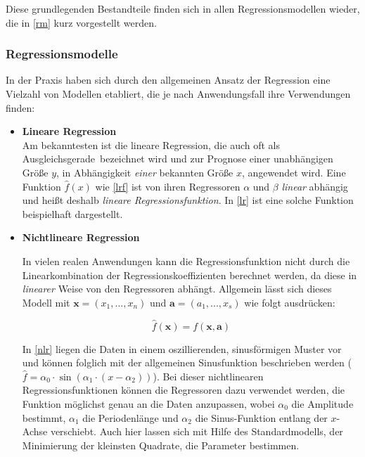 Diese grundlegenden Bestandteile finden sich in allen Regressionsmodellen wieder, die in \vref{rm} kurz vorgestellt werden. 


\subsubsection{Regressionsmodelle}\label{rm}
In der Praxis haben sich durch den allgemeinen Ansatz der Regression eine Vielzahl von Modellen etabliert, die je nach Anwendungsfall ihre Verwendungen finden:


\begin{itemize}


\item \textbf{Lineare Regression}
\\ Am bekanntesten ist die lineare Regression, die auch oft als \glqq Ausgleichsgerade\grqq~bezeichnet wird und zur Prognose einer unabhängigen Größe $y$, in Abhängigkeit \textit{einer} bekannten Größe $x$, angewendet wird. Eine Funktion $\hat{f}(x)$ wie \vref{lrf} ist von ihren Regressoren $\alpha$ und $\beta$ \textit{linear} abhängig und heißt deshalb \textit{lineare Regressionsfunktion}.\enlargethispage{\baselineskip} In \vref{lr} ist eine solche Funktion beispielhaft dargestellt.




\item \textbf{Nichtlineare Regression}

In vielen realen Anwendungen kann die Regressionsfunktion nicht durch die Linearkombination der Regressionskoeffizienten berechnet werden, da diese in \textit{linearer} Weise von den Regressoren abhängt. Allgemein lässt sich dieses Modell mit $\boldsymbol{x} = (x_1,...,x_n)$ und $\boldsymbol{a} = (a_1,...,x_s)$ wie folgt ausdrücken:

\begin{equation}
	\hat{f}(\boldsymbol{x}) = f(\boldsymbol{x},\boldsymbol{a})
\end{equation}

In \vref{nlr} liegen die Daten in einem oszillierenden, sinusförmigen Muster vor und können folglich mit der allgemeinen Sinusfunktion beschrieben werden ($\hat{f} = \alpha_0 \cdot \sin(\alpha_1 \cdot (x-\alpha_2))$). Bei dieser nichtlinearen Regressionsfunktionen können die Regressoren dazu verwendet werden, die Funktion möglichst genau an die Daten anzupassen, wobei $\alpha_0$ die Amplitude bestimmt, $\alpha_1$ die Periodenlänge und $\alpha_2$ die Sinus-Funktion entlang der $x$-Achse verschiebt. Auch hier lassen sich mit Hilfe des Standardmodells, der Minimierung der kleinsten Quadrate, die Parameter bestimmen.


\end{itemize}

